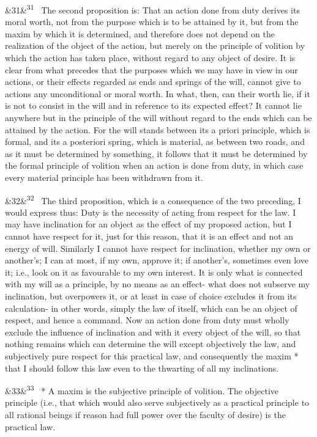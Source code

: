 \documentclass[12pt]{article}
\newcommand{\para}[1][]{\par\noindent\ifx&#1&\else\textsuperscript{\footnotesize #1}~\fi}
\begin{document}
\para[31] The second proposition is: That an action done from duty derives its moral worth, not from the purpose which is to be attained by it, but from the maxim by which it is determined, and therefore does not depend on the realization of the object of the action, but merely on the principle of volition by which the action has taken place, without regard to any object of desire. It is clear from what precedes that the purposes which we may have in view in our actions, or their effects regarded as ends and springs of the will, cannot give to actions any unconditional or moral worth. In what, then, can their worth lie, if it is not to consist in the will and in reference to its expected effect? It cannot lie anywhere but in the principle of the will without regard to the ends which can be attained by the action. For the will stands between its a priori principle, which is formal, and its a posteriori spring, which is material, as between two roads, and as it must be determined by something, it follows that it must be determined by the formal principle of volition when an action is done from duty, in which case every material principle has been withdrawn from it.

\para[32] The third proposition, which is a consequence of the two preceding, I would express thus: Duty is the necessity of acting from respect for the law. I may have inclination for an object as the effect of my proposed action, but I cannot have respect for it, just for this reason, that it is an effect and not an energy of will. Similarly I cannot have respect for inclination, whether my own or another's; I can at most, if my own, approve it; if another's, sometimes even love it; i.e., look on it as favourable to my own interest. It is only what is connected with my will as a principle, by no means as an effect- what does not subserve my inclination, but overpowers it, or at least in case of choice excludes it from its calculation- in other words, simply the law of itself, which can be an object of respect, and hence a command. Now an action done from duty must wholly exclude the influence of inclination and with it every object of the will, so that nothing remains which can determine the will except objectively the law, and subjectively pure respect for this practical law, and consequently the maxim * that I should follow this law even to the thwarting of all my inclinations.

\para[33] * A maxim is the subjective principle of volition. The objective principle (i.e., that which would also serve subjectively as a practical principle to all rational beings if reason had full power over the faculty of desire) is the practical law.
\end{document}
